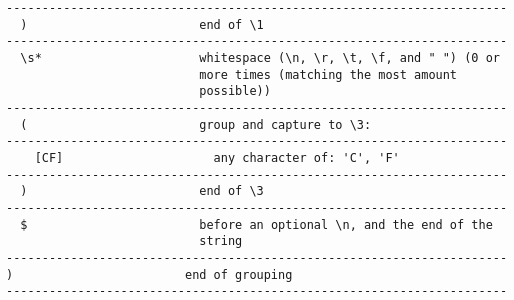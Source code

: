 \begin{latexonly}
\begin{verbatim}
----------------------------------------------------------------------
  )                        end of \1
----------------------------------------------------------------------
  \s*                      whitespace (\n, \r, \t, \f, and " ") (0 or
                           more times (matching the most amount
                           possible))
----------------------------------------------------------------------
  (                        group and capture to \3:
----------------------------------------------------------------------
    [CF]                     any character of: 'C', 'F'
----------------------------------------------------------------------
  )                        end of \3
----------------------------------------------------------------------
  $                        before an optional \n, and the end of the
                           string
----------------------------------------------------------------------
)                        end of grouping
----------------------------------------------------------------------
\end{verbatim}
\end{latexonly}
